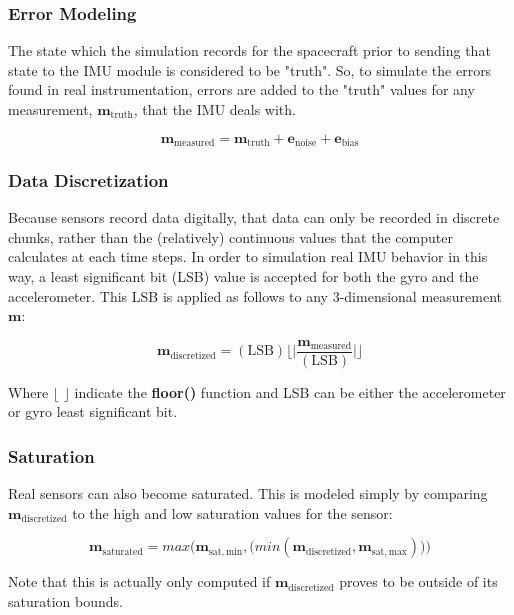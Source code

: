 \subsubsection{Error Modeling}
The state which the simulation records for the spacecraft prior to sending that state to the IMU module is considered to be "truth". So, to simulate the errors found in real instrumentation, errors are added to the "truth" values for any measurement, $\mathbf{m}_{\mathrm{truth}}$, that the IMU deals with.

\begin{equation}
\mathbf{m}_{\mathrm{measured}} = \mathbf{m}_{\mathrm{truth}} + \mathbf{e}_{\mathrm{noise}} + \mathbf{e}_{\mathrm{bias}}
\end{equation}


\subsubsection{Data Discretization}
Because sensors record data digitally, that data can only be recorded in discrete chunks, rather than the (relatively) continuous values that the computer calculates at each time steps. In order to simulation real IMU behavior in this way, a least significant bit (LSB) value is accepted for both the gyro and the accelerometer. This LSB is applied as follows to any 3-dimensional measurement $\mathbf{m}$:

\begin{equation}
\mathbf{m}_{\mathrm{discretized}} = (\mathrm{LSB})\Biggl\lfloor\Biggl|\frac{\mathbf{m}_{\mathrm{measured}}}{(\mathrm{LSB})}\Biggr|\Biggr\rfloor
\end{equation}

Where $\lfloor$  $\rfloor$ indicate the \textbf{floor()} function and LSB can be either the accelerometer or gyro least significant bit.

\subsubsection{Saturation}
Real sensors can also become saturated. This is modeled simply by comparing $\mathbf{m}_{\mathrm{discretized}}$ to the high and low saturation values for the sensor:

\begin{equation}
\mathbf{m}_{\mathrm{saturated}} = max\Big(\mathbf{m}_{\mathrm{sat,min}},\big(min(\mathbf{m}_{\mathrm{discretized}},\mathbf{m}_{\mathrm{sat,max}})\big)\Big)
\end{equation}

\noindent Note that this is actually only computed if $\mathbf{m}_{\mathrm{discretized}}$ proves to be outside of its saturation bounds.
